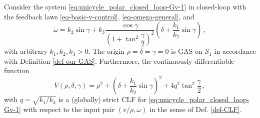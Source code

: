 \documentclass[10pt,a4paper]{amsart}
\begin{document}
\begin{theorem}
\label{thm:CLF_BoFo}
Consider the system \eqref{eq:unicycle_polar_closed_loop-Gv-1} in closed-loop with the feedback laws \eqref{eq-basic-v-control}, \eqref{eq-omega-general}, and 
\begin{equation}
\label{eq:BoFo}
\tilde\omega = k_2\sin\gamma + k_3\dfrac{\cos\gamma}{\left(1 + \tan^2 \dfrac{\gamma}{2}\right)^2}
\left(\delta + \dfrac{k_1}{k_2}\sin\gamma \right)\,,
\end{equation}
with arbitrary $k_1, k_2, k_3 > 0$.
The origin $\rho = \delta = \gamma = 0$ is GAS on $\mathcal{S}_1$ in accordance with Definition \ref{def-our-GAS}.
Furthermore, the continuously differentiable function
\begin{equation}
V(\rho,\delta, \gamma)  = 
\rho^2 + \left(\delta + \frac{k_1}{k_2} \sin \gamma \right)^2+ 4q^2 \tan ^2\frac{\gamma}{2} 
\,,  \label{eq:CLF_BoFo_gamma_delta}
\end{equation}
with $q = \sqrt{k_1/k_3}$ is a (globally) strict CLF for \eqref{eq:unicycle_polar_closed_loop-Gv-1} with respect to the input pair $(v/\rho,\omega)$ in the sense of Def. \ref{def-CLF}. 
\end{theorem}
\end{document}

